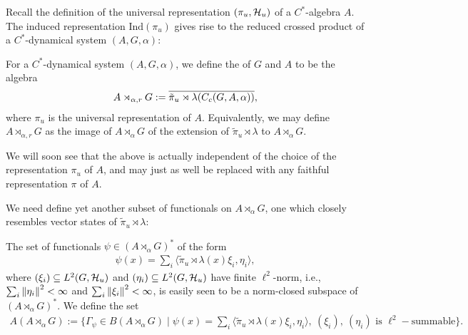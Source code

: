 Recall the definition of the universal representation $(\pi_u,\mathcal{H}_u)$ of a $C^*$-algebra $A$. The induced representation $\mathrm{Ind}(\pi_u)$ gives rise to the reduced crossed product of a $C^*$-dynamical system $(A,G,\alpha)$:
\begin{definition}
For a $C^*$-dynamical system $(A,G,\alpha)$, we define the  of $G$ and $A$ to be the algebra
\begin{align*}
	A \rtimes_{\alpha,r} G := \overline{\tilde \pi_u \rtimes \lambda (C_c(G,A,\alpha))},
\end{align*}
where $\pi_u$ is the universal representation of $A$. Equivalently, we may define $A \rtimes_{\alpha , r} G$ as the image of $A \rtimes_\alpha G$ of the extension of $\tilde \pi_u \rtimes \lambda$ to $A \rtimes_\alpha G$. 
\end{definition}
\begin{remark}
We will soon see that the above is actually independent of the choice of the representation $\pi_u$ of $A$, and may just as well be replaced with any faithful representation $\pi$ of $A$.
\end{remark}
We need define yet another subset of functionals on $A \rtimes_\alpha G$, one which closely resembles vector states of $\tilde \pi_u \rtimes \lambda$:
\begin{definition}
The set of functionals $\psi \in (A \rtimes_\alpha G)^*$ of the form
\begin{align*}
	\psi(x) = \sum_{i} \langle \tilde \pi_u \rtimes \lambda (x) \xi_i , \eta_i\rangle,
\end{align*}
where $(\xi_i)\subseteq L^2(G,\mathcal{H}_u)$ and $(\eta_i) \subseteq L^2(G,\mathcal{H}_u)$ have finite $\ell^2$-norm, i.e., $ \sum_i \left\lVert \eta_i\right\rVert^2 < \infty$ and $\sum_{i} \left\lVert \xi_i \right\rVert^2 < \infty$, is easily seen to be a norm-closed subspace of $(A \rtimes_\alpha G)^*$. We define the set 
\begin{align*}
	A(A \rtimes_\alpha G) := \{\Gamma_\psi \in B(A \rtimes_\alpha G) \mid \psi(x) = \sum_{i} \langle \tilde \pi_u \rtimes \lambda(x) \xi_i , \eta_i \rangle , \ (\xi_i), \ (\eta_i) \text{ is } \ell^2-\text{summable}\}.
\end{align*}
\end{definition}
